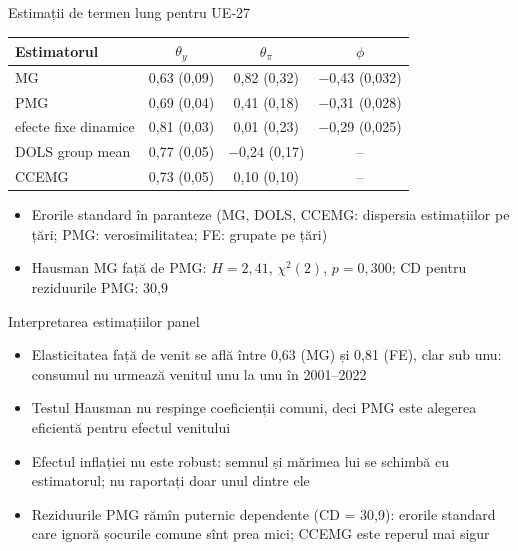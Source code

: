 \begin{frame}{Estimații de termen lung pentru UE-27}
\itemsize{\small}
\begin{center}
\footnotesize
\begin{tabular}{lccc}
\toprule
\textbf{Estimatorul} & $\theta_y$ & $\theta_\pi$ & $\phi$ \\
\midrule
MG & 0{,}63 (0{,}09) & 0{,}82 (0{,}32) & \ensuremath{-}0{,}43 (0{,}032) \\
PMG & 0{,}69 (0{,}04) & 0{,}41 (0{,}18) & \ensuremath{-}0{,}31 (0{,}028) \\
efecte fixe dinamice & 0{,}81 (0{,}03) & 0{,}01 (0{,}23) & \ensuremath{-}0{,}29 (0{,}025) \\
DOLS group mean & 0{,}77 (0{,}05) & \ensuremath{-}0{,}24 (0{,}17) & -- \\
CCEMG & 0{,}73 (0{,}05) & 0{,}10 (0{,}10) & -- \\
\bottomrule
\end{tabular}
\end{center}
\begin{itemize}
    \item Erorile standard în paranteze (MG, DOLS, CCEMG: dispersia estimațiilor pe țări; PMG: verosimilitatea; FE: grupate pe țări)
    \item Hausman MG față de PMG: $H = 2{,}41$, $\chi^2(2)$, $p = 0{,}300$; CD pentru reziduurile PMG: 30{,}9
\end{itemize}
\end{frame}

\begin{frame}{Interpretarea estimațiilor panel}
\itemsize{\small}
\begin{itemize}
    \item Elasticitatea față de venit se află între 0{,}63 (MG) și 0{,}81 (FE), clar sub unu: consumul nu urmează venitul unu la unu în 2001--2022
    \item Testul Hausman nu respinge coeficienții comuni, deci PMG este alegerea eficientă pentru efectul venitului
    \item Efectul inflației nu este robust: semnul și mărimea lui se schimbă cu estimatorul; nu raportați doar unul dintre ele
    \item Reziduurile PMG rămîn puternic dependente (CD = 30{,}9): erorile standard care ignoră șocurile comune sînt prea mici; CCEMG este reperul mai sigur
\end{itemize}
\end{frame}

